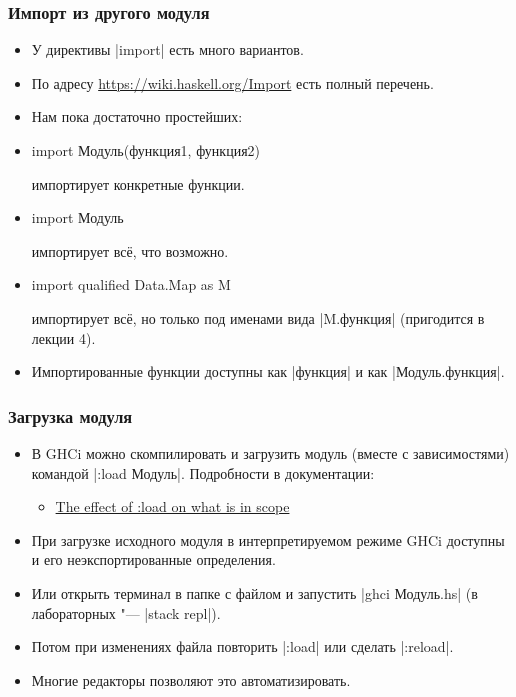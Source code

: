 \documentclass[10pt]{beamer}
\begin{document}
\begin{frame}[fragile]
  \frametitle{Импорт из другого модуля}
  \begin{itemize}
    \item У директивы \haskinline|import| есть много вариантов.
    \item По адресу \url{https://wiki.haskell.org/Import} есть полный перечень.
    \item Нам пока достаточно простейших:
    \item \begin{haskell}
            import Модуль(функция1, функция2)
          \end{haskell}
          импортирует конкретные функции.
    \item \begin{haskell}
            import Модуль
          \end{haskell}
          импортирует всё, что возможно.
    \item \begin{haskell}
            import qualified Data.Map as M
          \end{haskell}
          импортирует всё, но только под именами вида \haskinline|M.функция| (пригодится в лекции 4).
    \item Импортированные функции доступны как \haskinline|функция| и как \haskinline|Модуль.функция|.
  \end{itemize}
\end{frame}

\begin{frame}[fragile]
  \frametitle{Загрузка модуля}
  \begin{itemize}
    \item В GHCi можно скомпилировать и загрузить модуль (вместе с зависимостями) командой \haskinline|:load Модуль|. Подробности в документации:
          \begin{itemize}
            \item \href{http://downloads.haskell.org/~ghc/latest/docs/html/users_guide/ghci.html#ghci-load-scope}{The effect of :load on what is in scope}
          \end{itemize}
    \item При загрузке исходного модуля в интерпретируемом режиме GHCi доступны и его неэкспортированные определения.
    \item Или открыть терминал в папке с файлом и запустить \ghcinline|ghci Модуль.hs| (в лабораторных "--- \ghcinline|stack repl|).
    \item Потом при изменениях файла повторить \haskinline|:load| или сделать \haskinline|:reload|.
    \item Многие редакторы позволяют это автоматизировать.
  \end{itemize}
\end{frame}
\end{document}
